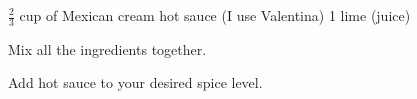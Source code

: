 \dishtype{\vegetarian, \sauce}
\begin{ingreds}
    $\frac{2}{3}$ cup of Mexican cream
    hot sauce (I use Valentina\textsuperscript{\textregistered})
    1 lime (juice)
\end{ingreds}
\begin{method}
    Mix all the ingredients together.\par
    Add hot sauce to your desired spice level.
\end{method}